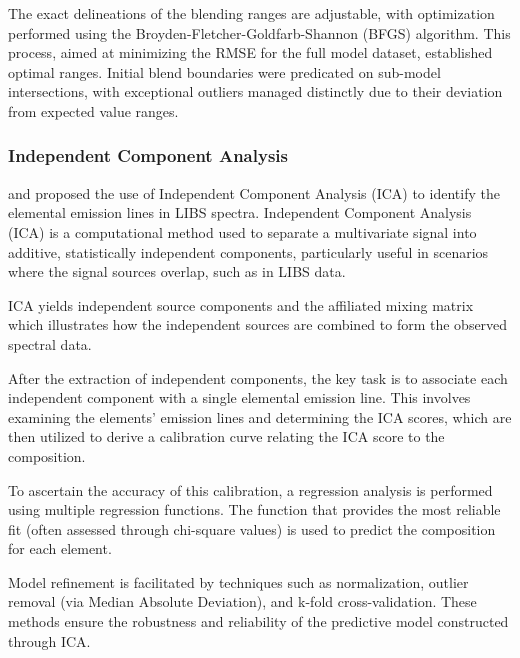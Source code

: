 The exact delineations of the blending ranges are adjustable, with optimization performed using the Broyden-Fletcher-Goldfarb-Shannon (BFGS) algorithm. This process, aimed at minimizing the RMSE for the full model dataset, established optimal ranges. Initial blend boundaries were predicated on sub-model intersections, with exceptional outliers managed distinctly due to their deviation from expected value ranges.

\subsubsection{Independent Component Analysis}\label{sec:ica}
\citet{cleggRecalibrationMarsScience2017} and \cite{forniIndependentComponentAnalysis2013} proposed the use of Independent Component Analysis (ICA) to identify the elemental emission lines in LIBS spectra. Independent Component Analysis (ICA) is a computational method used to separate a multivariate signal into additive, statistically independent components, particularly useful in scenarios where the signal sources overlap, such as in LIBS data.

ICA yields independent source components and the affiliated mixing matrix which illustrates how the independent sources are combined to form the observed spectral data.

After the extraction of independent components, the key task is to associate each independent component with a single elemental emission line. This involves examining the elements' emission lines and determining the ICA scores, which are then utilized to derive a calibration curve relating the ICA score to the composition.

To ascertain the accuracy of this calibration, a regression analysis is performed using multiple regression functions. The function that provides the most reliable fit (often assessed through chi-square values) is used to predict the composition for each element.

Model refinement is facilitated by techniques such as normalization, outlier removal (via Median Absolute Deviation), and k-fold cross-validation. These methods ensure the robustness and reliability of the predictive model constructed through ICA.

